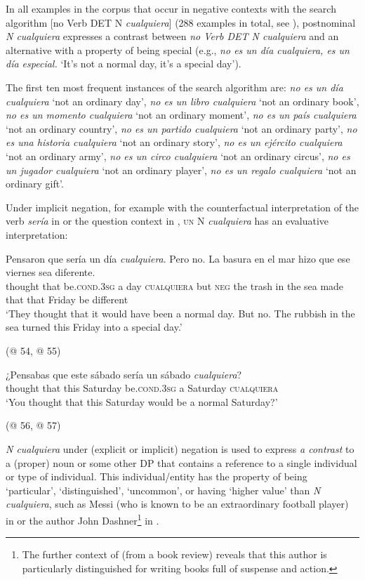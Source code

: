 {In all examples in the corpus that occur in negative contexts with the search algorithm [no Verb DET N \textit{cualquiera}] (288 examples in total, see ), postnominal \textit{N cualquiera} expresses a contrast between \textit{no Verb DET N cualquiera} and an alternative with a property of being special (e.g., \textit{no es un día cualquiera, es un día especial.} ‘It's not a normal day, it's a special day’). 

The first ten most frequent instances of the search algorithm are: {\textit{no es un día cualquiera} ‘not an ordinary day’, \textit{no es un libro cualquiera} ‘not an ordinary book’, \textit{no es un momento cualquiera} ‘not an ordinary moment’, \textit{no es un país cualquiera} ‘not an ordinary country’, \textit{no es un partido cualquiera} ‘not an ordinary party’, \textit{no es una historia cualquiera} ‘not an ordinary story’, \textit{no es un ejército cualquiera} ‘not an ordinary army’, \textit{no es un circo cualquiera} ‘not an ordinary circus’, \textit{no es un jugador cualquiera} ‘not an ordinary player’, \textit{no es un regalo cualquiera} ‘not an ordinary gift’}. 

Under implicit negation, for example with the counterfactual interpretation of the verb \textit{sería} in  or the question context in , \textsc{un} N \textit{cualquiera} has an evaluative interpretation:

\ea \label{bkm:Ref54634548}  %
\gll Pensaron que sería un día \textit{cualquiera}. Pero no. La basura en el mar hizo que ese viernes sea diferente.\\
thought that be.\textsc{cond.3sg} a day \textsc{cualquiera} but \textsc{neg} the trash in the sea made that that Friday be different\\
\glt ‘They thought that it would have been a normal day. But no. The rubbish in the sea turned this Friday into a special day.’

  (@ 54, @ 55)
\z

\ea \label{bkm:Ref54634539} %
\gll ¿Pensabas que este sábado sería un sábado \textit{cualquiera}?\\
thought that this Saturday be.\textsc{cond.3sg} a Saturday \textsc{cualquiera}\\
\glt ‘You thought that this Saturday would be a normal Saturday?’

  (@ 56, @ 57)
\z

\textit{N cualquiera} under (explicit or implicit) negation is used to express \textit{a contrast}\textbf{ }to a (proper) noun or some other DP that contains a reference to a single individual or type of individual. This individual/entity has the property of being ‘particular’, ‘distinguished’, ‘uncommon’, or having ‘higher value’ than \textit{N cualquiera}, such as Messi (who is known to be an extraordinary football player) in  or the author John Dashner\footnote{The further context of  (from a book review) reveals that this author is particularly distinguished for writing books full of suspense and action.} in .

}
